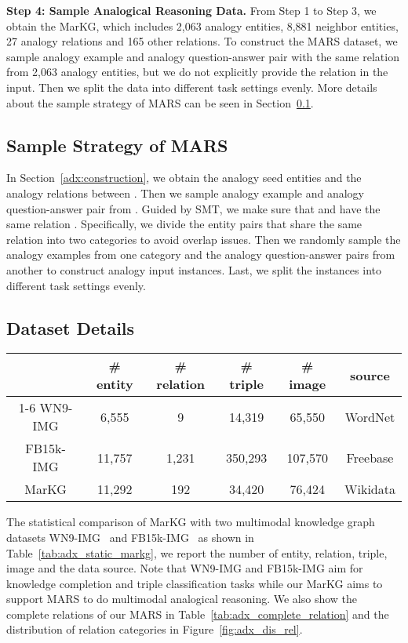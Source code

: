 \documentclass{article} \usepackage{iclr2023_conference,times}
\newcommand{\data}{MARS}
\newcommand{\kg}{MarKG}
\begin{document}
\textbf{Step 4: Sample Analogical Reasoning Data.}
From Step 1 to Step 3, we obtain the {\kg},
which includes 2,063 analogy entities, 8,881 neighbor entities, 27 analogy relations and 165 other relations. 
To construct the {\data} dataset, we sample analogy example  and analogy question-answer pair  with the same relation  from 2,063 analogy entities, but we do not explicitly provide the relation in the input.
Then we split the data into different task settings evenly.
More details about the sample strategy of {\data} can be seen in Section~\ref{adx:sample}.

\subsection{Sample Strategy of {\data}}
\label{adx:sample}

In Section~\ref{adx:construction}, we obtain the analogy seed entities  and the analogy relations between . Then we sample analogy example  and analogy question-answer pair  from . Guided by SMT, we make sure that  and  have the same relation . Specifically, we divide the entity pairs that share the same relation into two categories to avoid overlap issues. Then we randomly sample the analogy examples from one category and the analogy question-answer pairs from another to construct analogy input instances. 
Last, we split the instances into different task settings evenly.



\subsection{Dataset Details}
\label{sec:adx_dataset_static}

\begin{table*}[!htp]
\small
\centering
\begin{tabular}{cccccc}
\toprule
  & \# entity & \# relation & \# triple & \# image & source \\
\cmidrule{1-6}
WN9-IMG & 6,555 & 9 & 14,319 & 65,550 & WordNet \\
FB15k-IMG & 11,757 & 1,231 & 350,293 & 107,570 & Freebase \\
{\kg} & 11,292 & 192 & 34,420 & 76,424 & Wikidata \\
\bottomrule
\end{tabular}
\caption{Data statistics of {\kg}. \# refers to the number of.}
\label{tab:adx_static_markg}
\end{table*}


The statistical comparison of {\kg} with two multimodal knowledge graph datasets WN9-IMG~\citep{IKRL} and FB15k-IMG~\citep{MMKG} as shown in Table~\ref{tab:adx_static_markg}, we report the number of entity, relation, triple, image and the data source. Note that WN9-IMG and FB15k-IMG aim for knowledge completion and triple classification tasks while our {\kg} aims to support {\data} to do multimodal analogical reasoning. We also show the complete relations of our {\data} in Table~\ref{tab:adx_complete_relation} and the distribution of relation categories in Figure~\ref{fig:adx_dis_rel}.
\end{document}
